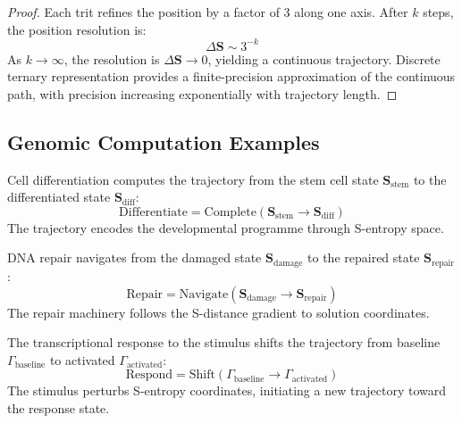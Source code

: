 \documentclass[11pt,a4paper]{article}
\theoremstyle{remark}
\newcommand{\Scoord}{\mathbf{S}}
\begin{document}
\begin{proof}
Each trit refines the position by a factor of 3 along one axis. After $k$ steps, the position resolution is:
\begin{equation}
\Delta\Scoord \sim 3^{-k}
\end{equation}
As $k \to \infty$, the resolution is $\Delta\Scoord \to 0$, yielding a continuous trajectory. Discrete ternary representation provides a finite-precision approximation of the continuous path, with precision increasing exponentially with trajectory length.
\end{proof}

\subsection{Genomic Computation Examples}

\begin{example}
\label{ex:differentiation}
Cell differentiation computes the trajectory from the stem cell state $\Scoord_{\text{stem}}$ to the differentiated state $\Scoord_{\text{diff}}$:
\begin{equation}
\text{Differentiate} = \text{Complete}(\Scoord_{\text{stem}} \to \Scoord_{\text{diff}})
\end{equation}
The trajectory encodes the developmental programme through S-entropy space.
\end{example}

\begin{example}
\label{ex:dna_repair}
DNA repair navigates from the damaged state $\Scoord_{\text{damage}}$ to the repaired state $\Scoord_{\text{repair}}$:
\begin{equation}
\text{Repair} = \text{Navigate}(\Scoord_{\text{damage}} \to \Scoord_{\text{repair}})
\end{equation}
The repair machinery follows the S-distance gradient to solution coordinates.
\end{example}

\begin{example}
\label{ex:transcription_response}
The transcriptional response to the stimulus shifts the trajectory from baseline $\Gamma_{\text{baseline}}$ to activated $\Gamma_{\text{activated}}$:
\begin{equation}
\text{Respond} = \text{Shift}(\Gamma_{\text{baseline}} \to \Gamma_{\text{activated}})
\end{equation}
The stimulus perturbs S-entropy coordinates, initiating a new trajectory toward the response state.
\end{example}
\end{document}

